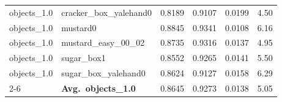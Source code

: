 \begin{longtable}{llrrrr}
  objects_1.0 & cracker\_box\_yalehand0 & 0.8189 & 0.9107 & 0.0199 & 4.50 \\
  objects_1.0 & mustard0 & 0.8845 & 0.9341 & 0.0108 & 6.16 \\
  objects_1.0 & mustard\_easy\_00\_02 & 0.8735 & 0.9316 & 0.0137 & 4.95 \\
  objects_1.0 & sugar\_box1 & 0.8552 & 0.9265 & 0.0141 & 5.50 \\
  objects_1.0 & sugar\_box\_yalehand0 & 0.8624 & 0.9127 & 0.0158 & 6.29 \\
  \cmidrule{2-6}
  & \textbf{Avg.~objects_1.0} & 0.8645 & 0.9273 & 0.0138 & 5.05 \\
  \midrule
\bottomrule
\end{longtable}